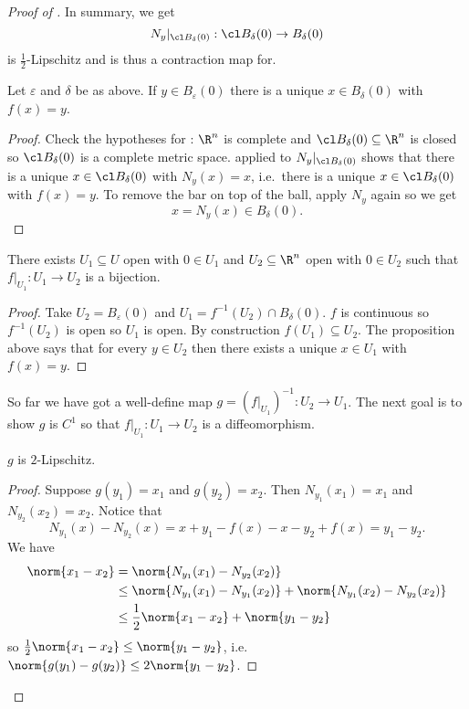 \documentclass[a4paper]{article}
\theoremstyle{definition}
\begin{document}
\begin{proof}[Proof of ]
  In summary, we get
  \[
    N_y|_{\cl B_\delta(0)}: \cl B_\delta(0) \to B_\delta(0)
  \]
  is \(\frac{1}{2}\)-Lipschitz and is thus a contraction map for.

  \begin{proposition}
    Let \(\varepsilon\) and \(\delta\) be as above. If \(y \in B_\varepsilon(0)\) there is a unique \(x \in B_\delta(0)\) with \(f(x) = y\).
  \end{proposition}

  \begin{proof}
    Check the hypotheses for : \(\R^n\) is complete and \(\cl B_\delta(0) \subseteq \R^n\) is closed so \(\cl B_\delta(0)\) is a complete metric space.  applied to \(N_y|_{\cl B_\delta(0)}\) shows that there is a unique \(x \in \cl B_\delta(0)\) with \(N_y(x) = x\), i.e.\ there is a unique \(x \in \cl B_\delta(0)\) with \(f(x) = y\). To remove the bar on top of the ball, apply \(N_y\) again so we get
    \[
      x = N_y(x) \in B_\delta(0).
    \]
  \end{proof}

  \begin{corollary}
    There exists \(U_1 \subseteq U\) open with \(0 \in U_1\) and \(U_2 \subseteq \R^n\) open with \(0 \in U_2\) such that \(f|_{U_1}: U_1 \to U_2\) is a bijection.
  \end{corollary}

  \begin{proof}
    Take \(U_2 = B_\varepsilon(0)\) and \(U_1 = f^{-1}(U_2) \cap B_\delta(0)\). \(f\) is continuous so \(f^{-1}(U_2)\) is open so \(U_1\) is open. By construction \(f(U_1) \subseteq U_2\). The proposition above says that for every \(y \in U_2\) then there exists a unique \(x \in U_1\) with \(f(x) = y\).
  \end{proof}

  So far we have got a well-define map \(g = (f|_{U_1})^{-1}: U_2 \to U_1\). The next goal is to show \(g\) is \(C^1\) so that \(f|_{U_1}: U_1 \to U_2\) is a diffeomorphism.

  \begin{lemma}
    \(g\) is \(2\)-Lipschitz.
  \end{lemma}

  \begin{proof}
    Suppose \(g(y_1) = x_1\) and \(g(y_2) = x_2\). Then \(N_{y_1}(x_1) = x_1\) and \(N_{y_2}(x_2) = x_2\). Notice that
    \[
      N_{y_1}(x) - N_{y_2}(x) = x + y_1 - f(x) - x - y_2 + f(x) = y_1 - y_2.
    \]
    We have
    \begin{align*}
      \norm{x_1 - x_2} &= \norm{N_{y_1}(x_1) - N_{y_2}(x_2)} \\
                       &\leq \norm{N_{y_1}(x_1) - N_{y_1}(x_2)} + \norm{N_{y_1}(x_2) - N_{y_2}(x_2)} \\
                       &\leq \frac{1}{2}\norm{x_1 - x_2} + \norm{y_1 - y_2}
    \end{align*}
    so \(\frac{1}{2}\norm{x_1 - x_2} \leq \norm{y_1 - y_2}\), i.e.\ \(\norm{g(y_1) - g(y_2)} \leq 2\norm{y_1 - y_2}\).
  \end{proof}


\end{proof}
\end{document}
